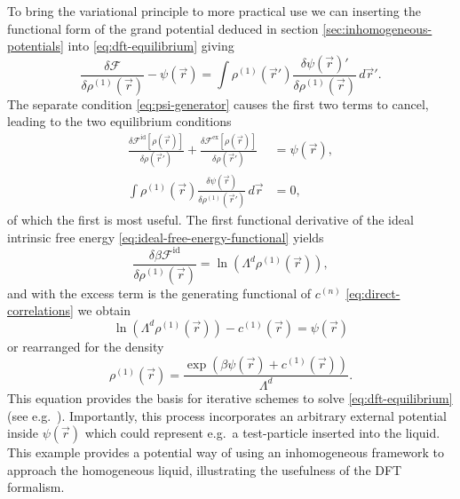 To bring the variational principle to more practical use we can inserting the functional form of the grand potential deduced in section \ref{sec:inhomogeneous-potentials} into \eqref{eq:dft-equilibrium} giving
\begin{equation*}
  \frac{\delta \mathcal{F}}{\delta \rho^{(1)}(\vec{r})}
  - \psi(\vec{r})
  =
  \int
  \rho^{(1)}(\vec{r}') \frac{\delta \psi(\vec{r})'}{\delta \rho^{(1)}(\vec{r})}
  \, d\vec{r}'.
\end{equation*}
The separate condition \eqref{eq:psi-generator} causes the first two terms to cancel, leading to the two equilibrium conditions
\begin{subequations}
  \begin{align}
    \label{eq:fmt-psi-equilibrium}
    \frac{\delta \mathcal{F}^\mathrm{id}[\rho(\vec{r})]}{\delta \rho(\vec{r}')}
    + \frac{\delta \mathcal{F}^\mathrm{ex}[\rho(\vec{r})]}{\delta \rho(\vec{r}')}
    &=
    \psi(\vec{r}),
    \\
    \int
    \rho^{(1)}(\vec{r}) \frac{\delta \psi(\vec{r})}{\delta \rho^{(1)}(\vec{r}')}
    \, d\vec{r}
    &=
    0,
  \end{align}
\end{subequations}
of which the first is most useful.
The first functional derivative of the ideal intrinsic free energy \eqref{eq:ideal-free-energy-functional} yields
\begin{equation*}
  \frac{
    \delta \beta \mathcal{F}^\mathrm{id}
  }{
    \delta \rho^{(1)}(\vec{r})
  }
  =
  \ln{(\Lambda^d \rho^{(1)}(\vec{r}))},
\end{equation*}
and with the excess term is the generating functional of $c^{(n)}$ \eqref{eq:direct-correlations} we obtain
\begin{equation*}
  \ln{(\Lambda^d \rho^{(1)}(\vec{r}))}
  - c^{(1)}(\vec{r})
  =
  \psi(\vec{r})
\end{equation*}
or rearranged for the density
\begin{equation}\label{eq:equilibrium-density}
  \rho^{(1)}(\vec{r})
  =
  \frac{
    \exp{\left(\beta\psi(\vec{r}) + c^{(1)}(\vec{r})\right)}
  }{ \Lambda^d }.
\end{equation}
This equation provides the basis for iterative schemes to solve \eqref{eq:dft-equilibrium} (see e.g.\ \cite{RothJPCM2010}).
Importantly, this process incorporates an arbitrary external potential inside $\psi(\vec{r})$ which could represent e.g.\ a test-particle inserted into the liquid.
This example provides a potential way of using an inhomogeneous framework to approach the homogeneous liquid, illustrating the usefulness of the DFT formalism.

